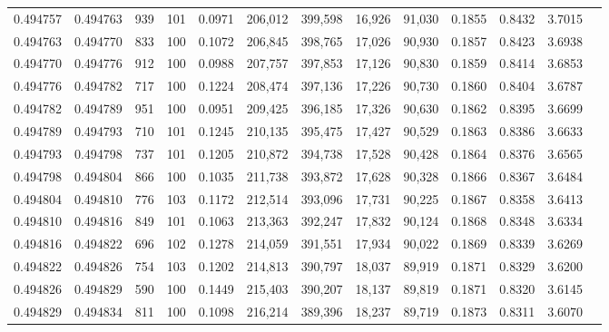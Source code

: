 \begin{tabular}{rrrrrrrrrrrrr}
0.494757 & 0.494763 &   939 & 101 &                                     0.0971 & 206,012 & 399,598 &  16,926 &  91,030 & 0.1855 & 0.8432 & 3.7015 \\
0.494763 & 0.494770 &   833 & 100 &                                     0.1072 & 206,845 & 398,765 &  17,026 &  90,930 & 0.1857 & 0.8423 & 3.6938 \\
0.494770 & 0.494776 &   912 & 100 &                                     0.0988 & 207,757 & 397,853 &  17,126 &  90,830 & 0.1859 & 0.8414 & 3.6853 \\
0.494776 & 0.494782 &   717 & 100 &                                     0.1224 & 208,474 & 397,136 &  17,226 &  90,730 & 0.1860 & 0.8404 & 3.6787 \\
0.494782 & 0.494789 &   951 & 100 &                                     0.0951 & 209,425 & 396,185 &  17,326 &  90,630 & 0.1862 & 0.8395 & 3.6699 \\
0.494789 & 0.494793 &   710 & 101 &                                     0.1245 & 210,135 & 395,475 &  17,427 &  90,529 & 0.1863 & 0.8386 & 3.6633 \\
0.494793 & 0.494798 &   737 & 101 &                                     0.1205 & 210,872 & 394,738 &  17,528 &  90,428 & 0.1864 & 0.8376 & 3.6565 \\
0.494798 & 0.494804 &   866 & 100 &                                     0.1035 & 211,738 & 393,872 &  17,628 &  90,328 & 0.1866 & 0.8367 & 3.6484 \\
0.494804 & 0.494810 &   776 & 103 &                                     0.1172 & 212,514 & 393,096 &  17,731 &  90,225 & 0.1867 & 0.8358 & 3.6413 \\
0.494810 & 0.494816 &   849 & 101 &                                     0.1063 & 213,363 & 392,247 &  17,832 &  90,124 & 0.1868 & 0.8348 & 3.6334 \\
0.494816 & 0.494822 &   696 & 102 &                                     0.1278 & 214,059 & 391,551 &  17,934 &  90,022 & 0.1869 & 0.8339 & 3.6269 \\
0.494822 & 0.494826 &   754 & 103 &                                     0.1202 & 214,813 & 390,797 &  18,037 &  89,919 & 0.1871 & 0.8329 & 3.6200 \\
0.494826 & 0.494829 &   590 & 100 &                                     0.1449 & 215,403 & 390,207 &  18,137 &  89,819 & 0.1871 & 0.8320 & 3.6145 \\
0.494829 & 0.494834 &   811 & 100 &                                     0.1098 & 216,214 & 389,396 &  18,237 &  89,719 & 0.1873 & 0.8311 & 3.6070 \\

\end{tabular}
